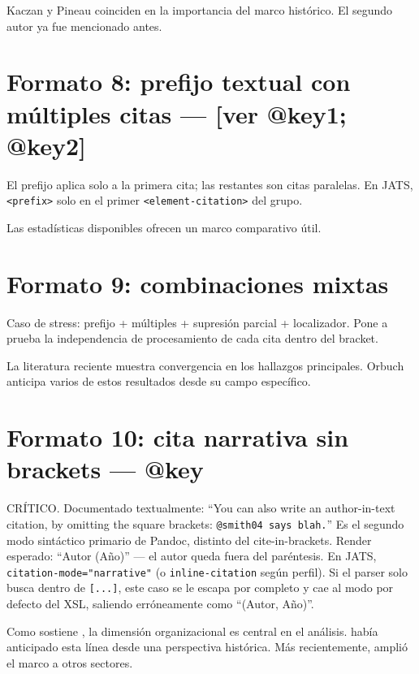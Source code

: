 \documentclass{article}
\begin{document}
Kaczan y Pineau \autocite{2961-KACZAN2016} \autocite*{3041-PINEAU1999} coinciden en la importancia del marco histórico. El segundo autor ya fue mencionado antes.


\section{Formato 8: prefijo textual con múltiples citas — [ver @key1; @key2]}
El prefijo aplica solo a la primera cita; las restantes son citas paralelas. En JATS, \texttt{<prefix>} solo en el primer \texttt{<element-citation>} del grupo.

Las estadísticas disponibles \autocite[ver][]{3036-ORBUCH2020,3041-PINEAU1999} ofrecen un marco comparativo útil.


\section{Formato 9: combinaciones mixtas}
Caso de stress: prefijo + múltiples + supresión parcial + localizador. Pone a prueba la independencia de procesamiento de cada cita dentro del bracket.

La literatura reciente \autocite{2961-KACZAN2016,3036-ORBUCH2020} \autocite*{3041-PINEAU1999} muestra convergencia en los hallazgos principales. Orbuch \autocite*[p. 228]{3036-ORBUCH2020} anticipa varios de estos resultados desde su campo específico.


\section{Formato 10: cita narrativa sin brackets — @key}
CRÍTICO. Documentado textualmente: “You can also write an author-in-text citation, by omitting the square brackets: \texttt{@smith04 says blah.}” Es el segundo modo sintáctico primario de Pandoc, distinto del cite-in-brackets. Render esperado: “Autor (Año)” — el autor queda fuera del paréntesis. En JATS, \texttt{citation-mode="narrative"} (o \texttt{inline-citation} según perfil). Si el parser solo busca dentro de \texttt{[...]}, este caso se le escapa por completo y cae al modo por defecto del XSL, saliendo erróneamente como “(Autor, Año)”.

Como sostiene \textcite{2961-KACZAN2016}, la dimensión organizacional es central en el análisis. \textcite{3041-PINEAU1999} había anticipado esta línea desde una perspectiva histórica. Más recientemente, \textcite{3036-ORBUCH2020} amplió el marco a otros sectores.
\end{document}
